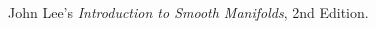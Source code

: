 \documentclass{article}
\theoremstyle{definition}
\renewcommand\det{\operatorname{det}}
\newcommand{\al}{\alpha}
\theoremstyle{theorem}
\newcommand{\Vol}{\operatorname{Vol}}
\begin{document}











\newpage











\begin{thebibliography}{99}




John Lee's \textit{Introduction to Smooth Manifolds}, 2nd Edition. 



\end{thebibliography}
\end{document}
